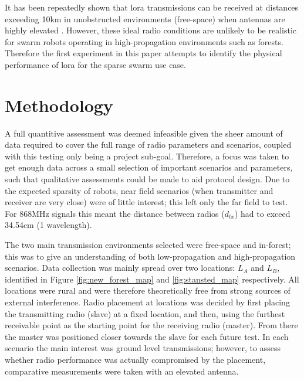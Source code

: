 It has been repeatedly shown that \ac{lora} transmissions can be received at distances exceeding 10km in  unobstructed environments (free-space) when antennas are highly elevated \cite{3YP:LORA_RANGE_REVIEW}. However, these ideal radio conditions are unlikely to be realistic for swarm robots operating in high-propagation environments such as forests. Therefore the first experiment in this paper attempts to identify the physical performance of \ac{lora} for the sparse swarm use case. 

\section{Methodology}
A full quantitive assessment was deemed infeasible given the sheer amount of data required to cover the full range of radio parameters and scenarios, coupled with this testing only being a project sub-goal. Therefore, a focus was taken to get enough data across a small selection of important scenarios and parameters, such that qualitative assessments could be made to aid protocol design. Due to the expected sparsity of robots, near field scenarios (when transmitter and receiver are very close) were of little interest; this left only the far field to test. For 868MHz signals this meant the distance between radios ($d_{tx}$) had to exceed 34.54cm (1 wavelength). 

 The two main transmission environments selected were free-space and in-forest; this was to give an understanding of both low-propagation and high-propagation scenarios. Data collection was mainly spread over two locations: \textbf{$L_{A}$} and \textbf{$L_{B}$}, identified in Figure \ref{fig:new_forest_map} and \ref{fig:stansted_map} respectively. All locations were rural and were therefore theoretically free from strong sources of external interference. Radio placement at locations was decided by first placing the transmitting radio (slave) at a fixed location, and then, using the furthest receivable point as the starting point for the receiving radio (master). From there the master was positioned closer towards the slave for each future test. In each scenario the main interest was ground level transmissions; however, to assess whether radio performance was actually compromised by the placement, comparative measurements were taken with an elevated antenna. 
 
